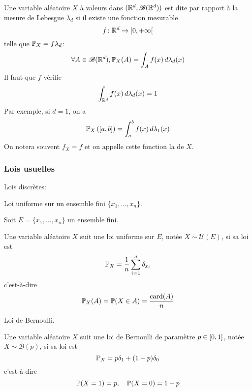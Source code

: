\begin{definition}
    Une variable aléatoire \(X\) à valeurs dans \((\mathbb{R}^d, \mathscr{B}(\mathbb{R}^d))\) est dite  par rapport
    à la mesure de Lebesgue \(\lambda_d\) si il existe une fonction mesurable
    \begin{equation*}
        f\colon \mathbb{R}^d\to \mathopen{}\left[0,+\infty\right[\mathclose{}
    \end{equation*}
    telle que \(\mathbb{P}_X = f\lambda_d\):
    \begin{equation*}
        \forall A\in\mathscr{B}(\mathbb{R}^d), \mathbb{P}_X(A) = \int_A f(x)\mathop{}\!{d}\lambda_d(x)
    \end{equation*}
    Il faut que \(f\) vérifie
    \begin{equation*}
        \int_{\mathbb{R}^d}f(x)\mathop{}\!{d}\lambda_d(x) = 1
    \end{equation*}
    Par exemple, si \(d=1\), on a
    \begin{equation*}
        \mathbb{P}_X\left(\mathopen{}\left[a,b\right]\mathclose{}\right) = \int_a^b f(x)\mathop{}\!{d}\lambda_1(x)
    \end{equation*}
    On notera souvent \(f_X = f\) et on appelle cette fonction la  de \(X\).
\end{definition}

\subsubsection{Lois usuelles}\label{subsubsec:2-2}


Lois discrètes:

Loi uniforme sur un ensemble fini \(\{x_1,\dots,x_n\}\).

Soit \(E = \{x_1,\dots,x_n\}\) un ensemble fini. 

Une variable aléatoire \(X\) suit une loi uniforme sur \(E\), notée \(X\sim\mathcal U(E)\), si sa loi est
\begin{equation*}
    \mathbb{P}_X = \frac{1}{n}\sum_{i=1}^n\delta_{x_i}
\end{equation*}
c'est-à-dire
\begin{equation*}
    \mathbb{P}_X(A) = \mathbb{P}(X\in A) = \frac{\text{card}(A)}{n}
\end{equation*}


Loi de Bernoulli.

Une variable aléatoire \(X\) suit une loi de Bernoulli de paramètre \(p\in\mathopen{}\left[0,1\right]\mathclose{}\), notée \(X\sim\mathcal B(p)\), si sa loi est
\begin{equation*}
    \mathbb{P}_X = p\delta_1 + (1-p)\delta_0
\end{equation*}
c'est-à-dire
\begin{equation*}
    \mathbb{P}(X=1) = p,\quad \mathbb{P}(X=0) = 1-p
\end{equation*}


